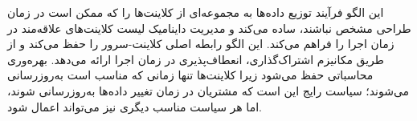 \begin{RTL}
این الگو فرآیند توزیع داده‌ها به مجموعه‌ای از کلاینت‌ها را که ممکن است
در زمان طراحی مشخص نباشند، ساده می‌کند و مدیریت داینامیک
لیست کلاینت‌های علاقه‌مند در زمان اجرا را فراهم می‌کند.
این الگو رابطه اصلی کلاینت-سرور را حفظ می‌کند و از طریق مکانیزم
اشتراک‌گذاری، انعطاف‌پذیری در زمان اجرا ارائه می‌دهد.
بهره‌وری محاسباتی حفظ می‌شود زیرا کلاینت‌ها تنها زمانی که
مناسب است به‌روزرسانی می‌شوند؛ سیاست رایج این است
که مشتریان در زمان تغییر داده‌ها به‌روزرسانی شوند، اما هر
سیاست مناسب دیگری نیز می‌تواند اعمال شود.
\end{RTL}